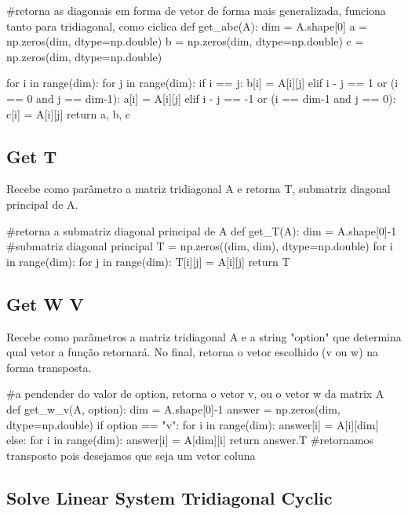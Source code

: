 \documentclass{article}
\begin{document}
\begin{python}
#retorna as diagonais em forma de vetor de forma mais generalizada, funciona tanto para tridiagonal, como ciclica
def get_abc(A):
    dim = A.shape[0]
    a = np.zeros(dim, dtype=np.double)
    b = np.zeros(dim, dtype=np.double)
    c = np.zeros(dim, dtype=np.double)

    for i in range(dim):
        for j in range(dim):
            if i == j:
                b[i] = A[i][j]
            elif i - j == 1 or (i == 0 and j == dim-1):
                a[i] = A[i][j]
            elif i - j == -1 or (i == dim-1 and j == 0):
                c[i] = A[i][j]
    return a, b, c
\end{python}

\subsection{Get T}
Recebe como parâmetro a matriz tridiagonal A e retorna T, submatriz diagonal principal de A.
\begin{python}
#retorna a submatriz diagonal principal de A
def get_T(A):
    dim = A.shape[0]-1 #submatriz diagonal principal
    T = np.zeros((dim, dim), dtype=np.double)
    for i in range(dim):
        for j in range(dim):
            T[i][j] = A[i][j]
    return T
\end{python}

\subsection{Get W V}
Recebe como parâmetros a matriz tridiagonal A e a string "option" que determina qual vetor a função retornará. No final, retorna o vetor escolhido (v ou w) na forma transposta. 

\begin{python}
#a pendender do valor de option, retorna o vetor v, ou o vetor w da matrix A
def get_w_v(A, option):
    dim = A.shape[0]-1
    answer = np.zeros(dim, dtype=np.double)
    if option == "v":
        for i in range(dim):
            answer[i] = A[i][dim]
    else:
        for i in range(dim):
            answer[i] = A[dim][i]
    return answer.T #retornamos transposto pois desejamos que seja um vetor coluna
\end{python}

\subsection{Solve Linear System Tridiagonal Cyclic}
\end{document}
